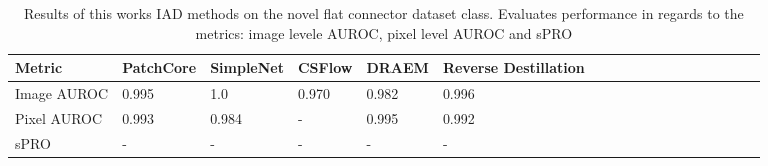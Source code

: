 \begin{table}[htbp]
    \tiny
    \centering
    \begin{tabularx}{\textwidth}{|X|X|X|X|X|X|X|X|X|X|X|X|X|X|X|X|X|X|}%
        \hline
        \textbf{Metric} & \textbf{PatchCore} \cite{patchCore2022} & \textbf{SimpleNet} \cite{liu2023simplenet} & \textbf{CSFlow }\cite{csflow2022} & \textbf{DRAEM} \cite{Zavrtanik_2021DRAEM} & \textbf{Reverse Destillation} \cite{revdist2023} \\
        \hline
        Image AUROC & 0.995 & 1.0 & 0.970 & 0.982 & 0.996 \\
        \hline
        Pixel AUROC & 0.993 & 0.984 & - & 0.995 & 0.992 \\
        \hline
        sPRO & - & - & - & - & - \\
        \hline
    \end{tabularx}
    \caption{Results of this works IAD methods on the novel flat connector dataset class. Evaluates performance in regards to the metrics: image levele AUROC, pixel level AUROC and sPRO}
    \label{tab:flatconnectorperformance}
\end{table}
